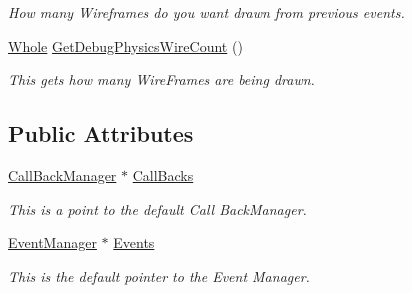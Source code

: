 \begin{DoxyCompactItemize}
\begin{DoxyCompactList}\small\item\em How many Wireframes do you want drawn from previous events. \item\end{DoxyCompactList}\item 
\hyperlink{namespacephys_a460f6bc24c8dd347b05e0366ae34f34a}{Whole} \hyperlink{classphys_1_1World_a1031d596580ac1a8d3593b5be9b49091}{GetDebugPhysicsWireCount} ()
\begin{DoxyCompactList}\small\item\em This gets how many WireFrames are being drawn. \item\end{DoxyCompactList}\end{DoxyCompactItemize}
\subsection*{Public Attributes}
\begin{DoxyCompactItemize}
\item 
\hyperlink{classphys_1_1CallBackManager}{CallBackManager} $\ast$ \hyperlink{classphys_1_1World_a22a1624c63198f49fdf8e448881bdb2e}{CallBacks}
\begin{DoxyCompactList}\small\item\em This is a point to the default Call BackManager. \item\end{DoxyCompactList}\item 
\hyperlink{classphys_1_1EventManager}{EventManager} $\ast$ \hyperlink{classphys_1_1World_ad0b13f1f3caf0342f56671b522543453}{Events}
\begin{DoxyCompactList}\small\item\em This is the default pointer to the Event Manager. \item\end{DoxyCompactList}\end{DoxyCompactItemize}

